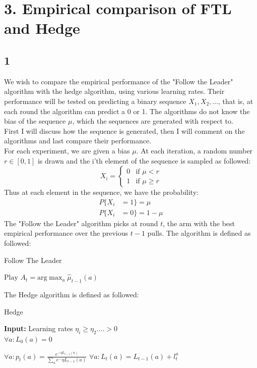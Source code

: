 \documentclass{article}
\begin{document}
\section{3. Empirical comparison of FTL and Hedge}
\subsection{1}
We wish to compare the empirical performance of the "Follow the Leader" algorithm with the hedge algorithm, using various learning rates. Their performance will be tested on predicting a binary sequence $X_1,X_2,...$, that is, at each round the algorithm can predict a 0 or 1. The algorithms do not know the bias of the sequence $\mu$, which the sequences are generated with respect to. \\ First I will discuss how the sequence is generated, then I will comment on the algorithms and last compare their performance. \\
For each experiment, we are given a bias $\mu$. At each iteration, a random number $r \in [0,1]$ is drawn and the i'th element of the sequence is sampled as followed:
\begin{equation}
X_i = \begin{cases}
0 &\text{if $\mu < r$}\\
1 &\text{if $\mu \geq r$}
\end{cases}
\end{equation}
Thus at each element in the sequence, we have the probability:
\begin{align}
P\lbrace X_i &= 1 \rbrace = \mu \\
P\lbrace X_i &= 0 \rbrace = 1-\mu
\end{align}
The "Follow the Leader" algorithm picks at round $t$, the arm with the best empirical performance over the previous $t-1$ pulls. The algorithm is defined as followed:
\begin{algorithm}[H]
\caption{Follow The Leader}\label{euclid}
\begin{algorithmic}[1]
\State $\text{Play } A_t = \text{arg} \max_{a} \hat{\mu}_{t-1}(a)$
\EndFor
\EndProcedure
\end{algorithmic}
\end{algorithm}
The Hedge algorithm is defined as followed:
\begin{algorithm}[H]
\caption{Hedge}
\hspace*{\algorithmicindent}\textbf{Input:} Learning rates $\eta_i \geq 
\eta_2 .... > 0$ \\
\hspace*{\algorithmicindent}$\forall a : L_0(a) = 0$ 
\begin{algorithmic}[1]
\State $\forall a : p_t(a) = \frac{e^{-\eta L_{t-1}(a)}}{\sum_a e^-{\eta L_{t-1}(a)}}$
\State {}
\State {} 
\State $\forall a: L_t(a) = L_{t-1}(a)+l_t^a$
\EndFor
\end{algorithmic}
\end{algorithm}
\end{document}
